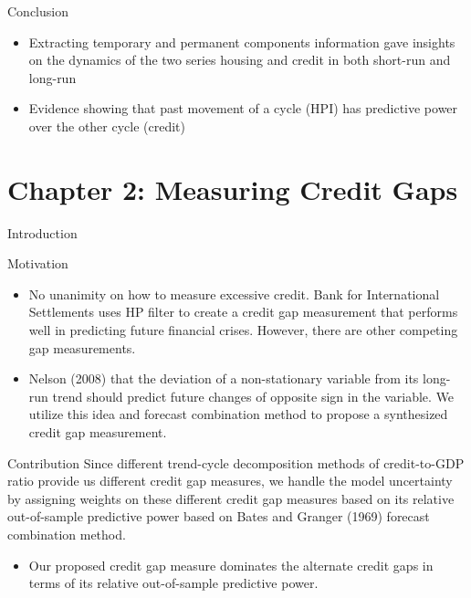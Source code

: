 \documentclass[
  ignorenonframetext,
]{beamer}
\providecommand{\tightlist}{%
  \setlength{\itemsep}{0pt}\setlength{\parskip}{0pt}}
\begin{document}
\begin{frame}{Conclusion}
\protect\hypertarget{conclusion}{}
\begin{itemize}
\tightlist
\item
  Extracting temporary and permanent components information gave
  insights on the dynamics of the two series housing and credit in both
  short-run and long-run
\item
  Evidence showing that past movement of a cycle (HPI) has predictive
  power over the other cycle (credit)
\end{itemize}
\end{frame}

\hypertarget{chapter-2-measuring-credit-gaps}{%
\section{Chapter 2: Measuring Credit
Gaps}\label{chapter-2-measuring-credit-gaps}}

\begin{frame}{Introduction}
\protect\hypertarget{introduction-1}{}
\begin{block}{Motivation}
\protect\hypertarget{motivation-1}{}
\begin{itemize}
\item
  No unanimity on how to measure excessive credit. Bank for
  International Settlements uses HP filter to create a credit gap
  measurement that performs well in predicting future financial crises.
  However, there are other competing gap measurements.
\item
  Nelson (2008) that the deviation of a non-stationary variable from its
  long-run trend should predict future changes of opposite sign in the
  variable. We utilize this idea and forecast combination method to
  propose a synthesized credit gap measurement.
\end{itemize}
\end{block}
\end{frame}

\begin{frame}{Contribution}
\protect\hypertarget{contribution-2}{}
Since different trend-cycle decomposition methods of credit-to-GDP ratio
provide us different credit gap measures, we handle the model
uncertainty by assigning weights on these different credit gap measures
based on its relative out-of-sample predictive power based on Bates and
Granger (1969) forecast combination method.

\begin{itemize}
\tightlist
\item
  Our proposed credit gap measure dominates the alternate credit gaps in
  terms of its relative out-of-sample predictive power.
\end{itemize}
\end{frame}
\end{document}
